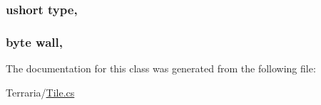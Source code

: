 \subsubsection[{type}]{\setlength{\rightskip}{0pt plus 5cm}ushort type\hspace{0.3cm}{\ttfamily [get]}, {\ttfamily [set]}}\label{classOTA_1_1Memory_1_1MemTile_afa7787a68eb26fb33dc369c00db629ca}
\hypertarget{classOTA_1_1Memory_1_1MemTile_a4ed736cd5ad29a9089e1cd84010565c3}{}
\subsubsection[{wall}]{\setlength{\rightskip}{0pt plus 5cm}byte wall\hspace{0.3cm}{\ttfamily [get]}, {\ttfamily [set]}}\label{classOTA_1_1Memory_1_1MemTile_a4ed736cd5ad29a9089e1cd84010565c3}


The documentation for this class was generated from the following file\+:\begin{DoxyCompactItemize}
\item 
Terraria/\hyperlink{Tile_8cs}{Tile.\+cs}\end{DoxyCompactItemize}
